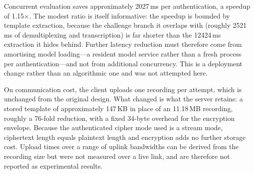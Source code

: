 \documentclass[10pt,journal,compsoc]{IEEEtran}
\begin{document}
{Concurrent evaluation saves approximately 2027\,ms per authentication, a speedup of 1.15$\times$. The modest ratio is itself informative: the speedup is bounded by template extraction, because the challenge branch it overlaps with (roughly 2521\,ms of demultiplexing and transcription) is far shorter than the 12424\,ms extraction it hides behind. Further latency reduction must therefore come from amortising model loading---a resident model service rather than a fresh process per authentication---and not from additional concurrency. This is a deployment change rather than an algorithmic one and was not attempted here.

On communication cost, the client uploads one recording per attempt, which is unchanged from the original design. What changed is what the server retains: a stored template of approximately 147\,KB in place of an 11.18\,MB recording, roughly a 76-fold reduction, with a fixed 34-byte overhead for the encryption envelope. Because the authenticated cipher mode used is a stream mode, ciphertext length equals plaintext length and encryption adds no further storage cost. Upload times over a range of uplink bandwidths can be derived from the recording size but were not measured over a live link, and are therefore not reported as experimental results.
}
\end{document}

